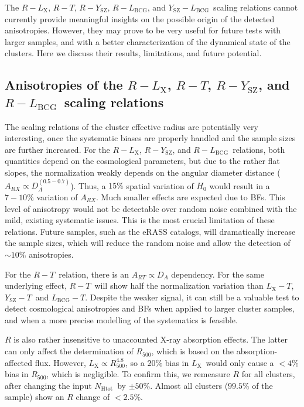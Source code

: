 \documentclass{aa}   %
\newcommand{\LT}{$L_{\text{X}}-T$}
\newcommand{\YT}{$Y_{\text{SZ}}-T$}
\newcommand{\LbcgT}{$L_{\text{BCG}}-T$}
\newcommand{\YLbcg}{$Y_{\text{SZ}}-L_{\text{BCG}}$}
\newcommand{\RL}{$R-L_{\text{X}}$}
\newcommand{\RY}{$R-Y_{\text{SZ}}$}
\newcommand{\RLbcg}{$R-L_{\text{BCG}}$}
\newcommand{\RT}{$R-T$}
\newcommand{\Lx}{$L_{\text{X}}$}
\newcommand{\nhtot}{$N_{\text{Htot}}$}
\begin{document}
The \RL, \RT, \RY, \RLbcg, and \YLbcg\ scaling relations cannot currently provide meaningful insights on the possible origin of the detected anisotropies. However, they may prove to be very useful for future tests with larger samples, and with a better characterization of the dynamical state of the clusters. Here we discuss their results, limitations, and future potential.

\subsection{Anisotropies of the \RL, \RT, \RY, and \RLbcg\ scaling relations}\label{R-relations}

The scaling relations of the cluster effective radius are potentially very interesting, once the systematic biases are properly handled and the sample sizes are further increased. For the \RL, \RY, and \RLbcg\ relations, both quantities depend on the cosmological parameters, but due to the rather flat slopes, the normalization weakly depends on the angular diameter distance ($A_{RX}\propto D_A^{(0.5-0.7)}$). Thus, a $15\%$ spatial variation of $H_0$ would result in a $7-10\%$ variation of $A_{RX}$. Much smaller effects are expected due to BFs. This level of anisotropy would not be detectable over random noise combined with the mild, existing systematic issues. This is the most crucial limitation of these relations. Future samples, such as the eRASS catalogs, will dramatically increase the sample sizes, which will reduce the random noise and allow the detection of $\sim 10\%$ anisotropies.

For the \RT\ relation, there is an $A_{RT}\propto D_A$ dependency. For the same underlying effect, \RT\ will show half the normalization variation than \LT, \YT\, and \LbcgT. Despite the weaker signal, it can still be a valuable test to detect cosmological anisotropies and BFs when applied to larger cluster samples, and when a more precise modelling of the systematics is feasible.

$R$ is also rather insensitive to unaccounted X-ray absorption effects. The latter can only affect the determination of $R_{500}$, which is based on the absorption-affected flux. However, \Lx$\propto R_{500}^{4.8}$, so a $20\%$ bias in \Lx\ would only cause a $<4\%$ bias in $R_{500}$, which is negligible. To confirm this, we remeasure $R$ for all clusters, after changing the input \nhtot\ by $\pm 50\%$. Almost all clusters ($99.5\%$ of the sample) show an $R$ change of $<2.5\%$.
\end{document}

